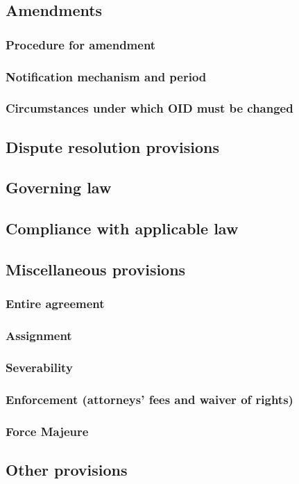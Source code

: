 \documentclass[10pt]{article}
\begin{document}
\subsection{Amendments}
\subsubsection{Procedure for amendment}
\subsubsection{Notification mechanism and period}
\subsubsection{Circumstances under which OID must be changed}
\subsection{Dispute resolution provisions}
\subsection{Governing law}
\subsection{Compliance with applicable law}
\subsection{Miscellaneous provisions}
\subsubsection{Entire agreement}
\subsubsection{Assignment}
\subsubsection{Severability}
\subsubsection{Enforcement (attorneys' fees and waiver of rights)}
\subsubsection{Force Majeure}
\subsection{Other provisions}

%
\end{document}
